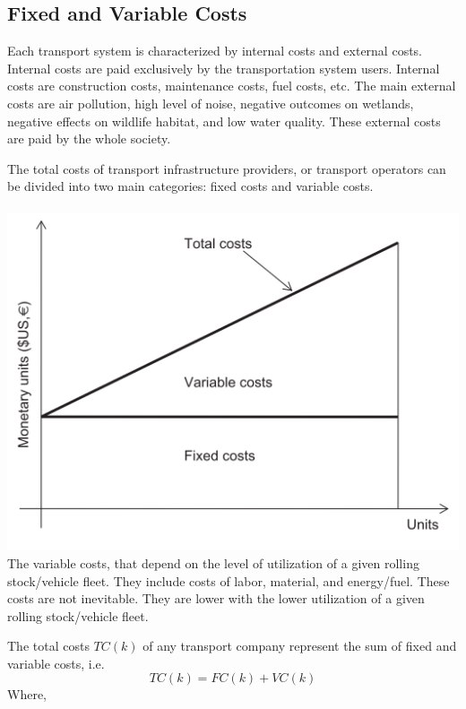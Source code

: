 \subsection{Fixed and Variable Costs}
Each transport system is characterized by internal costs and external costs. Internal costs are paid exclusively by the transportation system users. Internal costs are construction costs, maintenance costs, fuel costs, etc. The main external costs are air pollution, high level of noise, negative outcomes on wetlands, negative effects on wildlife habitat, and low water quality. These external costs are paid by the whole society.\\
\par
The total costs of transport infrastructure providers, or transport operators can be divided into two main categories: fixed costs and variable costs.\\\\
\includegraphics{gfx/fig11.png}\\
The variable costs, that depend on the level of utilization of a given rolling stock/vehicle fleet. They include costs of labor, material, and energy/fuel. These costs are not inevitable. They are lower with the lower utilization of a given rolling stock/vehicle fleet.\\
\par
The total costs $TC(k)$ of any transport company represent the sum of fixed and variable costs, i.e.
\begin{equation}
	\label{total cost}
	TC(k) = FC(k) + VC(k)
\end{equation}
%
Where,\\
